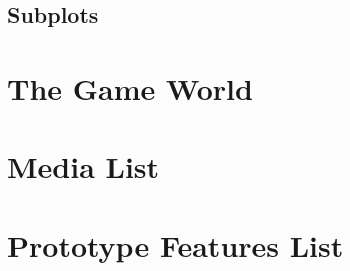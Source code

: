 \documentclass[12pt]{article}
\begin{document}
\subsection{Subplots}

\newpage

\section{The Game World}

\newpage

\section{Media List}

\newpage

\section{Prototype Features List}
\end{document}
